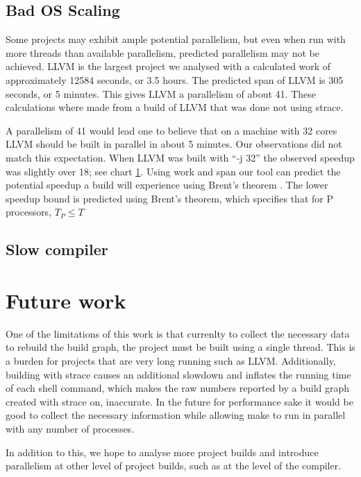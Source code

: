 \documentclass[twocolumn,sigplan,10pt,review]{acmart}
\begin{document}
\subsection{Bad OS Scaling}

Some projects may exhibit ample potential parallelism, but even when run with more threads than
available parallelism, predicted parallelism may not be achieved.  LLVM \cite{} is the largest
project we analysed with a calculated work of approximately 12584 seconds, or 3.5 hours.  The
predicted span of LLVM is 305 seconds, or 5 minutes.  This gives LLVM a parallelism of about 41.
These calculations where made from a build of LLVM that was done not using strace.

A parallelism of 41 would lead one to believe that on a machine with 32 cores LLVM should be built
in parallel in about 5 minutes.  Our observations did not match this expectation.  When LLVM was
built with ``-j 32'' the observed speedup was slightly over 18; see chart \ref{}.  Using work and
span our tool can predict the potential speedup a build will experience using Brent's theorem
\cite{}.  The lower speedup bound is predicted using Brent's theorem, which specifies that for
P processors, \begin{math} T_P \leq T \end{math}



\subsection{Slow compiler}

\section{Future work}

One of the limitations of this work is that currenlty to collect the necessary data to rebuild
the build graph, the project must be built using a single thread.  This is a burden for projects
that are very long running such as LLVM.  Additionally, building with strace causes an additional
slowdown and inflates the running time of each shell command, which makes the raw numbers
reported by a build graph created with strace on, inaccurate.  In the future for performance sake
it would be good to collect the necessary information while allowing make to run in parallel with
any number of processes.

In addition to this, we hope to analyse more project builds and introduce parallelism at other
level of project builds, such as at the level of the compiler.  
\end{document}
